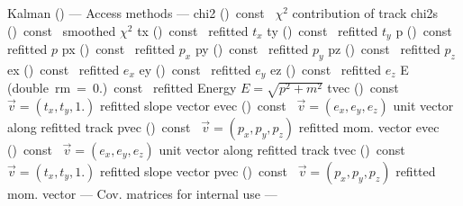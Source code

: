 \documentclass{article}
\begin{document}
\begin{cxxentry}
\begin{cxxclass}
\begin{cxxpublic}
        {}
        {}
\label{cxx.1.3.2}
\cxxitem{}
        {\cxxtilde Kalman}
        {()}
        {}
        {}
\label{cxx.1.3.3}
\cxxitem{}
        {--- Access methods --- }
        {}
        {}
        {}
\label{cxx.1.3.4}
        {chi2}
        {()\ const\ }
        { $\chi^2$ contribution of track}
        {}
\label{cxx.1.3.5}
        {chi2s}
        {()\ const\ }
        { smoothed $\chi^2$}
        {}
\label{cxx.1.3.6}
        {tx}
        {()\ const\ }
        { refitted $t_x$}
        {}
\label{cxx.1.3.7}
        {ty}
        {()\ const\ }
        { refitted $t_y$}
        {}
\label{cxx.1.3.8}
        {p}
        {()\ const\ }
        { refitted $p$}
        {}
\label{cxx.1.3.9}
        {px}
        {()\ const\ }
        { refitted $p_x$}
        {}
\label{cxx.1.3.10}
        {py}
        {()\ const\ }
        { refitted $p_y$}
        {}
\label{cxx.1.3.11}
        {pz}
        {()\ const\ }
        { refitted $p_z$}
        {}
\label{cxx.1.3.12}
        {ex}
        {()\ const\ }
        { refitted $e_x$}
        {}
\label{cxx.1.3.13}
        {ey}
        {()\ const\ }
        { refitted $e_y$}
        {}
\label{cxx.1.3.14}
        {ez}
        {()\ const\ }
        { refitted $e_z$}
        {}
\label{cxx.1.3.15}
        {E}
        {(double\ rm\ =\ 0.)\ const\ }
        { refitted Energy $E = \sqrt{p^2 + m^2}$}
        {}
\label{cxx.1.3.16}
        {tvec}
        {()\ const\ }
        { $\vec{v} = (t_x,t_y,1.)$ refitted slope vector}
        {}
\label{cxx.1.3.17}
        {evec}
        {()\ const\ }
        { $\vec{v} = (e_x,e_y,e_z)$ unit vector along refitted track}
        {}
\label{cxx.1.3.18}
        {pvec}
        {()\ const\ }
        { $\vec{v} = (p_x,p_y,p_z)$ refitted mom. vector}
        {}
\label{cxx.1.3.19}
        {evec}
        {()\ const\ }
        { $\vec{v} = (e_x,e_y,e_z)$ unit vector along refitted track}
        {}
\label{cxx.1.3.20}
        {tvec}
        {()\ const\ }
        { $\vec{v} = (t_x,t_y,1.)$ refitted slope vector}
        {}
\label{cxx.1.3.21}
        {pvec}
        {()\ const\ }
        { $\vec{v} = (p_x,p_y,p_z)$ refitted mom. vector}
        {}
\label{cxx.1.3.22}
\cxxitem{}
        {--- Cov. matrices for internal use --- }

\end{cxxpublic}
\end{cxxclass}
\end{cxxentry}
\end{document}
